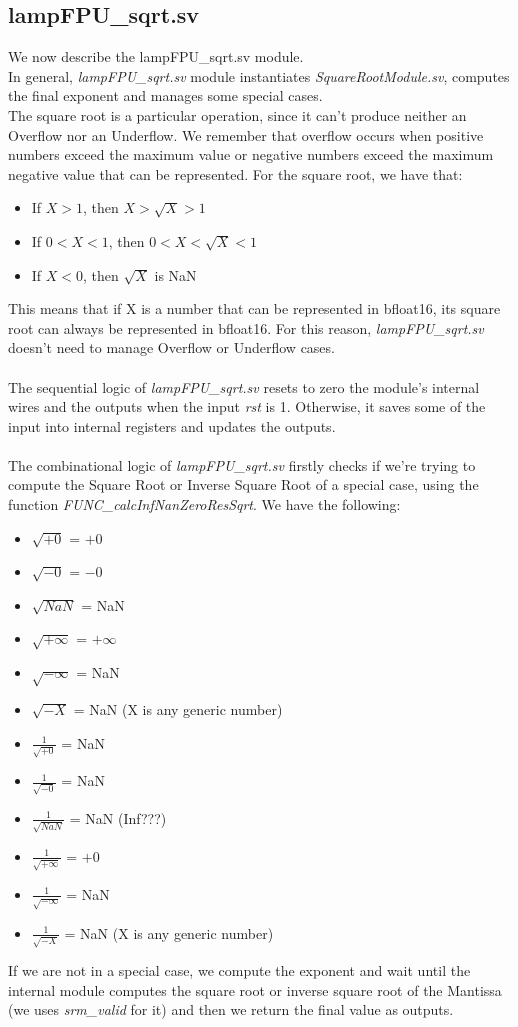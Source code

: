 \subsection{lampFPU\_sqrt.sv}
We now describe the lampFPU\_sqrt.sv module.\\
In general, \emph{lampFPU\_sqrt.sv} module instantiates \emph{SquareRootModule.sv}, computes the final exponent and manages some special cases. \\ 
The square root is a particular operation, since it can't produce neither an Overflow nor an Underflow. We remember that overflow occurs when positive numbers exceed the maximum value or negative numbers exceed the maximum negative value that can be represented. For the square root, we have that:
\begin{itemize}
\item If $X > 1$, then $X > \sqrt{X} > 1$ 
\item If $0 < X < 1$, then $0 < X < \sqrt{X} < 1$
\item If $X < 0$, then $\sqrt{X}$ is NaN
\end{itemize}
This means that if X is a number that can be represented in bfloat16, its square root can always be represented in bfloat16. For this reason, \emph{lampFPU\_sqrt.sv} doesn't need to manage Overflow or Underflow cases.\\ \\
The sequential logic of  \emph{lampFPU\_sqrt.sv} resets to zero the module's internal wires and the outputs when the input \emph{rst} is 1. Otherwise, it saves some of the input into internal registers and updates the outputs.\\\\
The combinational logic of \emph{lampFPU\_sqrt.sv} firstly checks if we're trying to compute the Square Root or Inverse Square Root of a special case, using the function \emph{FUNC\_calcInfNanZeroResSqrt}. We have the following:
\begin{itemize}
\item $\sqrt{+0}$ = $+0$ 
\item $\sqrt{-0}$ = $-0$
\item $\sqrt{NaN}$ = NaN
\item $\sqrt{+ \infty}$  =  $+\infty$
\item $\sqrt{- \infty}$ =  NaN
\item $\sqrt{- X}$ = NaN  (X is any generic number) 
\item $\frac{1}{\sqrt{+0}}$ = NaN
\item $\frac{1}{\sqrt{-0}}$ = NaN
\item $\frac{1}{\sqrt{NaN}}$ = NaN (Inf???)
\item $\frac{1}{\sqrt{+\infty}}$ = $+0$
\item $\frac{1}{\sqrt{-\infty}}$ = NaN
\item $\frac{1}{\sqrt{-X}}$ = NaN  (X is any generic number) 
\end{itemize}

If we are not in a special case, we compute the exponent and wait until the internal module computes the square root or inverse square root of the Mantissa (we uses  \emph{srm\_valid} for it) and then we return the final value as outputs. 

\clearpage
